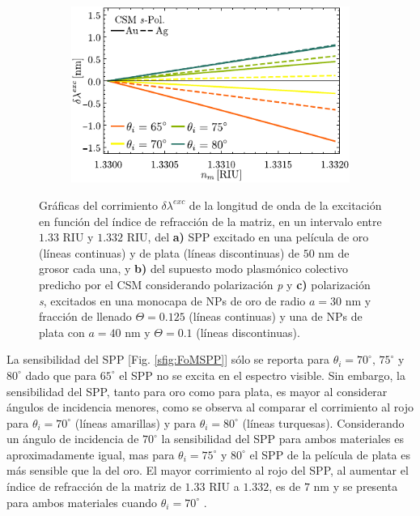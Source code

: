 \begin{figure}[h!]
	\begin{subfigure}{.45\linewidth}\centering
	\includegraphics[scale=1]{2-Resultados/figs/11-SPPCSM/6_Sens_h20_CSMS.pdf}\end{subfigure}\vspace*{-.5em}
	\caption{Gráficas del corrimiento $\delta\lambda^{exc}$ de la longitud de onda de la excitación  en función del índice de refracción de la matriz, en un intervalo entre $1.33$ RIU y $1.332$ RIU, del \textbf{a)} SPP excitado en una película de oro (líneas continuas) y de plata (líneas discontinuas) de $50$ nm de grosor cada una, y  \textbf{b)} del supuesto modo  plasmónico colectivo predicho por el CSM considerando polarización \emph{p} y \textbf{c)}  polarización \emph{s}, excitados en una monocapa de NPs de oro de radio $a=30$ nm y fracción de llenado $\Theta=0.125$ (líneas continuas) y una de NPs de plata con $a=40$ nm y $\Theta=0.1$ (líneas discontinuas).}\label{fig:FoMSPPCSM}
	\end{figure}	

La sensibilidad del SPP [Fig. \ref{sfig:FoMSPP}] sólo se reporta para $\theta_i=70^\circ,\, 75^\circ$ y $80^\circ$ dado que para $65^\circ$ el SPP no se excita en el espectro visible. Sin embargo, la sensibilidad del SPP, tanto para oro como para plata, es mayor al considerar ángulos de incidencia  menores, como se observa al comparar el corrimiento al rojo para $\theta_i=70^\circ$ (líneas amarillas) y para $\theta_i=80^\circ$ (líneas turquesas). Considerando un ángulo de incidencia de $70^\circ$ la sensibilidad del SPP para ambos materiales es aproximadamente igual, mas para $\theta_i=75^\circ$ y $80^\circ$ el SPP de la película de plata es más sensible que la del oro. El mayor corrimiento al rojo del SPP, al aumentar  el índice de refracción de la matriz  de $1.33$ RIU a $1.332$, es de $7$ nm y se presenta para ambos materiales cuando $\theta_i=70^\circ$  .

